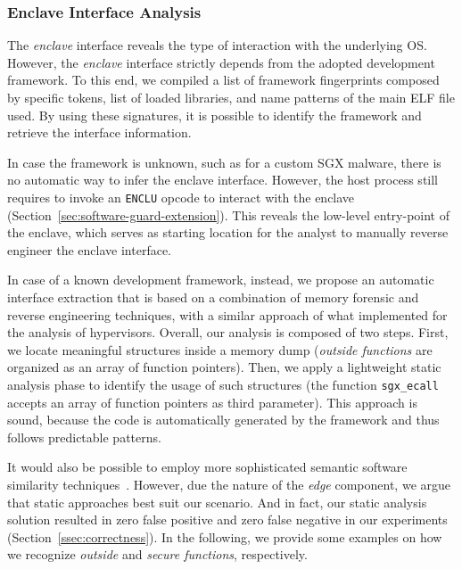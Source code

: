 \subsubsection{Enclave Interface Analysis}

The \emph{enclave} interface reveals the type of interaction with the 
underlying OS.
However, the \emph{enclave} interface strictly depends from the adopted 
development 
framework.
To this end, we compiled a list of framework fingerprints composed by 
specific tokens, list of loaded libraries, and name patterns of the main 
ELF file used. By using these signatures, it is possible to identify the 
framework
and retrieve the interface information.

In case the framework is unknown, such as for a custom 
SGX malware, there is no automatic way to infer the enclave interface. 
However, the host process still requires to invoke an \texttt{ENCLU} opcode to 
interact with the enclave (Section~\ref{sec:software-guard-extension}).
This reveals the low-level entry-point of the enclave, which serves as starting
location for the analyst to manually reverse engineer the enclave interface.

In case of a known development framework, instead, we propose an 
automatic interface extraction that is based on a combination of memory 
forensic and reverse engineering techniques, with a similar approach of what 
\cite{grazianohyper} implemented for the analysis of hypervisors.
Overall, our analysis is composed of two steps. First, we locate meaningful
structures inside a memory dump (\eg \emph{outside functions} are organized as
an array of function pointers). Then, we apply a lightweight static analysis 
phase to identify the
usage of such structures (\eg the function \texttt{sgx\_ecall} accepts an array
of function pointers as third parameter). This approach 
is sound, because the code is automatically generated by the
framework and thus follows predictable patterns.

It would also be possible to employ more sophisticated semantic software 
similarity techniques~\citep{pei2020trex}. However, due the nature of the 
\emph{edge} component, we argue that static approaches best suit our scenario.
And in fact, our static analysis solution resulted in zero false positive and 
zero false negative in our experiments (Section~\ref{ssec:correctness}).
In the following, we provide some examples on how we recognize \emph{outside} 
and \emph{secure functions}, respectively.

